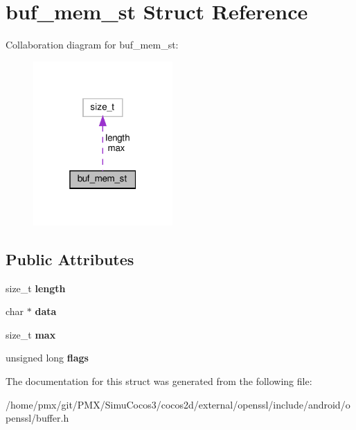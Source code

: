 \hypertarget{structbuf__mem__st}{}\section{buf\+\_\+mem\+\_\+st Struct Reference}
\label{structbuf__mem__st}


Collaboration diagram for buf\+\_\+mem\+\_\+st\+:
\nopagebreak
\begin{figure}[H]
\begin{center}
\leavevmode
\includegraphics[width=151pt]{structbuf__mem__st__coll__graph}
\end{center}
\end{figure}
\subsection*{Public Attributes}
\begin{DoxyCompactItemize}
\item 
\mbox{\label{structbuf__mem__st_aa2bd5895b125d1b8f3ec5db5914abf21}} 
size\+\_\+t {\bfseries length}
\item 
\mbox{\label{structbuf__mem__st_afee436cb0909cc71dc3489a7bd8215a4}} 
char $\ast$ {\bfseries data}
\item 
\mbox{\label{structbuf__mem__st_a300f344aae77102e18dde58449b18ed3}} 
size\+\_\+t {\bfseries max}
\item 
\mbox{\label{structbuf__mem__st_a033ec4739efe81fafb499307a227d3a5}} 
unsigned long {\bfseries flags}
\end{DoxyCompactItemize}


The documentation for this struct was generated from the following file\+:\begin{DoxyCompactItemize}
\item 
/home/pmx/git/\+P\+M\+X/\+Simu\+Cocos3/cocos2d/external/openssl/include/android/openssl/buffer.\+h\end{DoxyCompactItemize}
